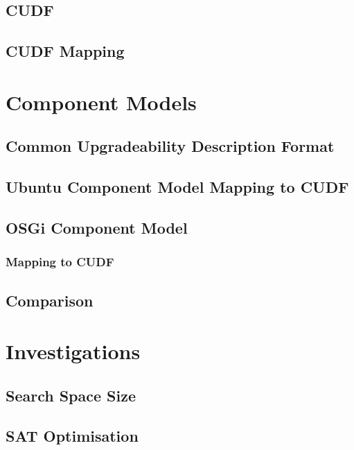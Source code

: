 \documentclass{report}
\begin{document}
\section{CUDF}

\section{CUDF Mapping}



\chapter{Component Models}

\section{Common Upgradeability Description Format}

\section{Ubuntu Component Model Mapping to CUDF}

\section{OSGi Component Model}
\subsection{Mapping to CUDF}

\section{Comparison}

\chapter{Investigations}

\section{Search Space Size}

\section{SAT Optimisation}
\end{document}
